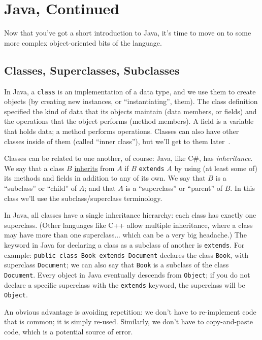 




\section*{Java, Continued}

Now that you've got a short introduction to Java, it's time to move on to some more complex object-oriented bits of the language.

\subsection*{Classes, Superclasses, Subclasses}
In Java, a \texttt{class} is an implementation of a data type, and we use them to create objects (by creating new instances, or ``instantiating'', them). The class definition specified the kind of data that its objects maintain (data members, or fields) and the operations that the object performs (method members). A field is a variable that holds data; a method performs operations. Classes can also have other classes inside of them (called ``inner class''), but we'll get to them later~\cite{dswj}.

Classes can be related to one another, of course: Java, like C\#, has \textit{inheritance}. We say that a class $B$ \underline{inherits} from $A$ if $B$ \texttt{extends} $A$ by using (at least some of) its methods and fields in addition to any of its own. We say that $B$ is a ``subclass'' or ``child'' of $A$; and that $A$ is a ``superclass'' or ``parent'' of $B$. In this class we'll use the subclass/superclass terminology.

In Java, all classes have a single inheritance hierarchy: each class has exactly one superclass. (Other languages like C++ allow multiple inheritance, where a class may have more than one superclass... which can be a very big headache.) The keyword in Java for declaring a class as a subclass of another is \texttt{extends}. For example: \texttt{public class Book extends Document} declares the class \texttt{Book}, with superclass \texttt{Document}; we can also say that \texttt{Book} is a subclass of the class \texttt{Document}. Every object in Java eventually descends from \texttt{Object}; if you do not declare a specific superclass with the \texttt{extends} keyword, the superclass will be \texttt{Object}.

An obvious advantage is avoiding repetition: we don't have to re-implement code that is common; it is simply re-used. Similarly, we don't have to copy-and-paste code, which is a  potential source of error. 

